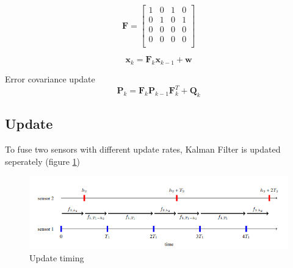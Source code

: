 \begin{equation}\label{equ:transition_matrix_H}
    \mathbf{F} = 
    \begin{bmatrix}
        1 & 0 & 1 & 0 \\
        0 & 1 & 0 & 1 \\
        0 & 0 & 0 & 0 \\
        0 & 0 & 0 & 0 \\
      \end{bmatrix}
\end{equation}

\begin{equation}\label{equ:predict_eq}
    \mathbf{x}_k=\mathbf{F}_k\mathbf{x}_{k-1}+\mathbf{w}
\end{equation}

Error covariance update
\begin{equation}\label{equ:error_covariance}
    \mathbf{P}_k=\mathbf{F}_k \mathbf{P}_{k-1} \mathbf{F}_k^T+\mathbf{Q}_k
\end{equation}

\subsection{Update}\label{equ:2_update}
To fuse two sensors with different update rates, Kalman Filter is updated seperately (figure \ref{fig:sync_fig})
\begin{figure}[hpbt]
    \centering
    \includegraphics[width=\textwidth]{Figures/sync.png}%
    \caption{Update timing \cite{7472511}}
    \label{fig:sync_fig}
\end{figure}

